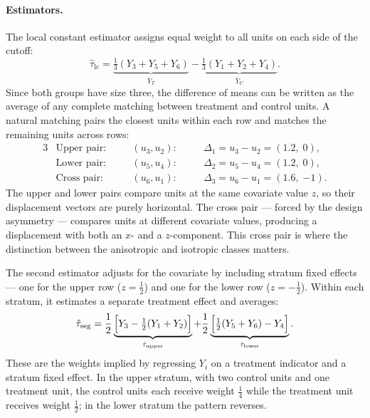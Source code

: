 \paragraph{Estimators.}
The local constant estimator assigns equal weight to all units on each side of the cutoff:
\begin{equation}\label{eq:lc_estimator}
	\hat\tau_{\mathrm{lc}} = \underbrace{\tfrac{1}{3}(Y_3 + Y_5 + Y_6)}_{\bar{Y}_T} - \underbrace{\tfrac{1}{3}(Y_1 + Y_2 + Y_4)}_{\bar{Y}_C}.
\end{equation}
Since both groups have size three, the difference of means can be written as the average of any complete matching between treatment and control units.
A natural matching pairs the closest units within each row and matches the remaining units across rows:
\begin{alignat*}{3}
	&\text{Upper pair:}  &\quad& (u_3, u_2): &\quad& \Delta_1 = u_3 - u_2 = (1.2,\; 0), \\
	&\text{Lower pair:}  &\quad& (u_5, u_4): &\quad& \Delta_2 = u_5 - u_4 = (1.2,\; 0), \\
	&\text{Cross pair:}  &\quad& (u_6, u_1): &\quad& \Delta_3 = u_6 - u_1 = (1.6,\; {-1}).
\end{alignat*}
The upper and lower pairs compare units at the same covariate value $z$, so their displacement vectors are purely horizontal.
The cross pair --- forced by the design asymmetry --- compares units at different covariate values, producing a displacement with both an $x$- and a $z$-component.
This cross pair is where the distinction between the anisotropic and isotropic classes matters.

The second estimator adjusts for the covariate by including stratum fixed effects --- one for the upper row ($z = \tfrac{1}{2}$) and one for the lower row ($z = -\tfrac{1}{2}$).
Within each stratum, it estimates a separate treatment effect and averages:
\begin{equation}\label{eq:seg_estimator}
	\hat\tau_{\mathrm{seg}} = \frac{1}{2}\underbrace{\Bigl[Y_3 - \tfrac{1}{2}(Y_1 + Y_2)\Bigr]}_{\hat\tau_{\mathrm{upper}}} + \frac{1}{2}\underbrace{\Bigl[\tfrac{1}{2}(Y_5 + Y_6) - Y_4\Bigr]}_{\hat\tau_{\mathrm{lower}}}.
\end{equation}
These are the weights implied by regressing $Y_i$ on a treatment indicator and a stratum fixed effect.
In the upper stratum, with two control units and one treatment unit, the control units each receive weight $\tfrac{1}{4}$ while the treatment unit receives weight $\tfrac{1}{2}$; in the lower stratum the pattern reverses.

